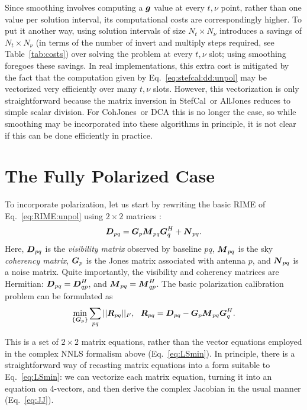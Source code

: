 \documentclass[useAMS,usenatbib]{mn2e}
\newcommand{\vecg}{\bmath{g}}
\newcommand{\mat}[1]{{\bmath{#1}}}
\newcommand{\DD}{\mat{D}}
\newcommand{\MM}{\mat{M}}
\newcommand{\RR}{\mat{R}}
\newcommand{\GG}{\mat{G}}
\newcommand{\COH}{{\sc CohJones}}
\newcommand{\StefCal}{{\sc StefCal}}
\numberwithin{equation}{section}
\begin{document}
Since smoothing involves computing a $\vecg$ value at every $t,\nu$ point, rather than one value per
solution interval, its computational costs are correspondingly higher. To put it another way, using solution intervals of 
size $N_t\times N_\nu$ introduces a savings of $N_t\times N_\nu$ (in terms of the number of invert and multiply steps required, see 
Table~\ref{tab:costs}) over solving the problem at every $t,\nu$ slot; using smoothing foregoes these savings.
In real implementations, this extra cost is mitigated 
by the fact that  the computation given by Eq.~\ref{eq:stefcal:dd:unpol} may be vectorized very efficiently over many $t,\nu$ slots.
However, this vectorization is only straightforward because the matrix inversion in \StefCal\ or {\sc AllJones} reduces to simple 
scalar division.  For \COH\ or DCA this is no longer the case, so while smoothing may be incorporated into these algorithms 
in principle, it is not clear if this can be done efficiently in practice.

\section{The Fully Polarized Case}
\label{sec:pol}

To incorporate polarization, let us start by rewriting the basic RIME of Eq.~\ref{eq:RIME:unpol} using $2\times 2$ matrices 
\citep[a full derivation may be found in][]{RRIME1}:
\begin{equation}
\label{eq:RIME:pol}
\DD_{pq} = \GG_p \MM_{pq} \GG^H_q + \mat{N}_{pq}.
\end{equation}
Here, $\DD_{pq}$ is the \emph{visibility matrix} observed by baseline $pq$, $\MM_{pq}$ is the sky \emph{coherency matrix},
$\GG_p$ is the Jones matrix associated with antenna $p$, and $\mat{N}_{pq}$ is a noise matrix. Quite importantly, 
the visibility and coherency matrices are Hermitian: 
$\DD_{pq}=\DD^H_{qp}$, and $\MM_{pq}=\MM^H_{qp}$. The basic polarization calibration problem can be formulated as
\begin{equation}
\label{eq:cal:DI:pol}
\min_{\{\GG_p\}}\sum_{pq}||\RR_{pq}||_F,~~
\RR_{pq} = \DD_{pq}-\GG_p \MM_{pq} \GG^H_q.
\end{equation}

This is a set of $2\times2$ matrix equations, rather than the vector equations employed in the complex NNLS formalism 
above (Eq.~\ref{eq:LSmin}). In principle, there is a straightforward way of recasting matrix equations into a 
form suitable to  Eq.~\ref{eq:LSmin}: we can vectorize each matrix equation, turning it into an equation on 4-vectors, 
and then derive the complex Jacobian in the usual manner (Eq.~\ref{eq:JJ}). 
\end{document}

